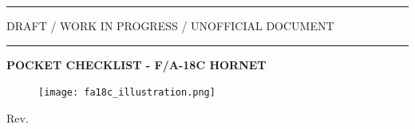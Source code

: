 \begin{titlepage}
\begin{center}
        \vspace*{0.35cm}
        
        \hrule
       	    
        \vspace{.5cm}
        
        \begin{center}
          \small
          \large{
            DRAFT / WORK IN PROGRESS / UNOFFICIAL DOCUMENT
          }        
        \end{center}

        \vspace{.5cm}

        \hrule

        \vspace{1.5cm}

        \begin{center}
          \small
          \LARGE{
            \textbf{POCKET CHECKLIST - F/A-18C HORNET}
          }
        \end{center}

        \vspace{.5cm}

        \begin{figure}[!ht]
          \centering
          \texttt{[image: fa18c\_illustration.png]}
          \label{fig:fa18c_illustration}
        \end{figure}

        \vfill
        
        \normalsize
        Rev. \revisionNumber
        
	\end{center}
\end{titlepage}


